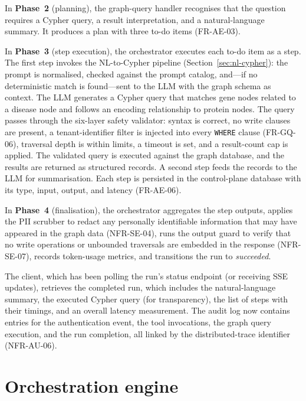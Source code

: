 \documentclass[a4paper]{sapthesis}
\begin{document}
In \textbf{Phase~2} (planning), the graph-query handler recognises that
the question requires a Cypher query, a result interpretation, and a
natural-language summary.  It produces a plan with three to-do items
(FR-AE-03).

In \textbf{Phase~3} (step execution), the orchestrator executes each to-do
item as a step.  The first step invokes the NL-to-Cypher pipeline
(Section~\ref{sec:nl-cypher}): the prompt is normalised, checked against
the prompt catalog, and---if no deterministic match is found---sent to the
LLM with the graph schema as context.  The LLM generates a Cypher query
that matches gene nodes related to a disease node and follows an encoding
relationship to protein nodes.  The query passes through the six-layer
safety validator: syntax is correct, no write clauses are present,
a tenant-identifier filter is injected into every \texttt{WHERE} clause
(FR-GQ-06), traversal depth is within limits, a timeout is set, and a
result-count cap is applied.  The validated query is executed against the
graph database, and the results are returned as structured records.  A
second step feeds the records to the LLM for summarisation.  Each step is
persisted in the control-plane database with its type, input, output, and
latency (FR-AE-06).

In \textbf{Phase~4} (finalisation), the orchestrator aggregates the step
outputs, applies the PII scrubber to redact any personally identifiable
information that may have appeared in the graph data (NFR-SE-04), runs
the output guard to verify that no write operations or unbounded traversals
are embedded in the response (NFR-SE-07), records token-usage metrics, and
transitions the run to \emph{succeeded}.

The client, which has been polling the run's status endpoint (or receiving
SSE updates), retrieves the completed run, which includes the
natural-language summary, the executed Cypher query (for transparency),
the list of steps with their timings, and an overall latency measurement.
The audit log now contains entries for the authentication event, the tool
invocations, the graph query execution, and the run completion, all linked
by the distributed-trace identifier (NFR-AU-06).


\section{Orchestration engine}
\label{sec:orchestration-engine}
\end{document}
